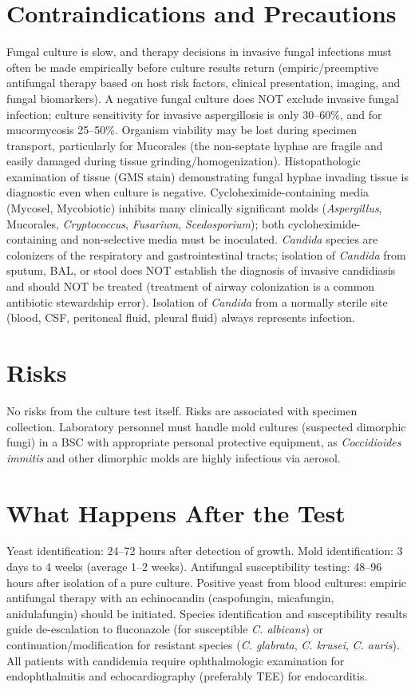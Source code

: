 \section*{Contraindications and Precautions}
Fungal culture is slow, and therapy decisions in invasive fungal infections must often be made empirically before culture results return (empiric/preemptive antifungal therapy based on host risk factors, clinical presentation, imaging, and fungal biomarkers). A negative fungal culture does NOT exclude invasive fungal infection; culture sensitivity for invasive aspergillosis is only 30--60\%, and for mucormycosis 25--50\%. Organism viability may be lost during specimen transport, particularly for Mucorales (the non-septate hyphae are fragile and easily damaged during tissue grinding/homogenization). Histopathologic examination of tissue (GMS stain) demonstrating fungal hyphae invading tissue is diagnostic even when culture is negative. Cycloheximide-containing media (Mycosel, Mycobiotic) inhibits many clinically significant molds (\textit{Aspergillus}, Mucorales, \textit{Cryptococcus}, \textit{Fusarium}, \textit{Scedosporium}); both cycloheximide-containing and non-selective media must be inoculated. \textit{Candida} species are colonizers of the respiratory and gastrointestinal tracts; isolation of \textit{Candida} from sputum, BAL, or stool does NOT establish the diagnosis of invasive candidiasis and should NOT be treated (treatment of airway colonization is a common antibiotic stewardship error). Isolation of \textit{Candida} from a normally sterile site (blood, CSF, peritoneal fluid, pleural fluid) always represents infection.

\section*{Risks}
No risks from the culture test itself. Risks are associated with specimen collection. Laboratory personnel must handle mold cultures (suspected dimorphic fungi) in a BSC with appropriate personal protective equipment, as \textit{Coccidioides immitis} and other dimorphic molds are highly infectious via aerosol.

\section*{What Happens After the Test}
Yeast identification: 24--72 hours after detection of growth. Mold identification: 3 days to 4 weeks (average 1--2 weeks). Antifungal susceptibility testing: 48--96 hours after isolation of a pure culture. Positive yeast from blood cultures: empiric antifungal therapy with an echinocandin (caspofungin, micafungin, anidulafungin) should be initiated. Species identification and susceptibility results guide de-escalation to fluconazole (for susceptible \textit{C. albicans}) or continuation/modification for resistant species (\textit{C. glabrata}, \textit{C. krusei}, \textit{C. auris}). All patients with candidemia require ophthalmologic examination for endophthalmitis and echocardiography (preferably TEE) for endocarditis.


